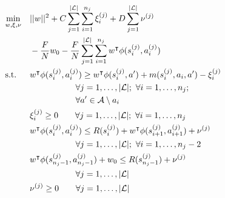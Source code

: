 \begin{align}
& \underset{w, \xi, \nu}{\text{min}}  & & ||\weights{}||^2 + \marginslackc{} \sum_{j=1}^{\labelsetsize{}} \sum_{i=1}^{\nsub{j}} \marginslacksubsup{i}{(j)}
                                                      + \bellmanslackc{} \sum_{j=1}^{\labelsetsize{}} \bellmanslacksup{(j)} \notag \\
&    & & - \frac{\bellmanc{}}{\labelsatotal{}} \weightszero{} - \frac{\bellmanc{}}{\labelsatotal{}} \sum_{j=1}^{\labelsetsize{}} \sum_{i=1}^{\nsub{j}} \weightst{}\features{\statesubsup{i}{(j)}}{\actionsubsup{i}{(j)}}\\
& \text{s.t.} & &\weightst{} \features{\statesubsup{i}{(j)}}{\actionsubsup{i}{(j)}} \geq \weightst{} \phi(\statesubsup{i}{(j)}, \actionvar{}') + \marginvar{}(\statesubsup{i}{(j)}, \actionsub{i}, \actionvar{}') - \marginslacksubsup{i}{(j)} \notag\\
    &&&\hspace{1.9cm}\forall j = 1, \ldots, \labelsetsize{}; \text{ } \forall i = 1, \ldots, \nsub{j}; \notag\\
    &&&\hspace{1.9cm}\forall \actionvar{}' \in \actionset{}\setminus \actionvar{}_i  \notag\\
&    & & \marginslacksubsup{i}{(j)} \geq 0 \hspace{0.7cm} \forall j = 1, \ldots, \labelsetsize{}; \text{ } \forall i = 1, \ldots, \nsub{j} \notag\\
&    & & \weightst{}\features{\statesubsup{i}{(j)}}{\actionsubsup{i}{(j)}} \leq \rewardfn{}(\statesubsup{i}{(j)}) + \weightst{}\features{\statesubsup{i+1}{(j)}}{\actionsubsup{i+1}{(j)}} + \bellmanslacksup{(j)} \notag \\
    &&&\hspace{1.9cm} \forall j = 1, \ldots, \labelsetsize{}; \text{ } \forall i = 1, \ldots, \nsub{j} - 2 \label{eq:bellman_constr}\\
&    & & \weightst{}\features{\statesubsup{\nsub{j}-1}{(j)}}{\actionsubsup{\nsub{j}-1}{(j)}} + \weightszero \leq \rewardfn{}(\statesubsup{\nsub{j}-1}{(j)}) + \bellmanslacksup{(j)} \notag \\
    &&&\hspace{1.9cm} \forall j = 1, \ldots, \labelsetsize{} \label{eq:bellman_goal_constr}\\
&    & & \bellmanslacksup{(j)} \geq 0 \hspace{0.7cm} \forall j = 1, \ldots, \labelsetsize{} \label{eq:bellman_slack}
\end{align}

